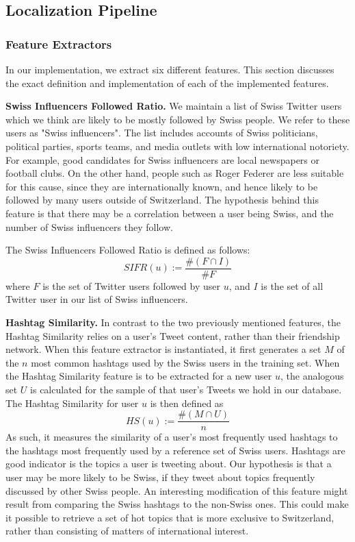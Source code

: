 \documentclass[10pt,a4paper]{article}
\begin{document}
\subsection{Localization Pipeline}
\subsubsection{Feature Extractors}
In our implementation, we extract six different features. This section discusses the exact definition and implementation of each of the implemented features.

\textbf{Swiss Influencers Followed Ratio.} We maintain a list of Swiss Twitter users which we think are likely to be mostly followed by Swiss people. We refer to these users as "Swiss influencers". The list includes accounts of Swiss politicians, political parties, sports teams, and media outlets with low international notoriety. For example, good candidates for Swiss influencers are local newspapers or football clubs. On the other hand, people such as Roger Federer are less suitable for this cause, since they are internationally known, and hence likely to be followed by many users outside of Switzerland. The hypothesis behind this feature is that there may be a correlation between a user being Swiss, and the number of Swiss influencers they follow.

The Swiss Influencers Followed Ratio is defined as follows:
\begin{equation}
SIFR(u) := \frac{\#(F\cap I)}{\#F}
\end{equation}
where $F$ is the set of Twitter users followed by user $u$, and $I$ is the set of all Twitter user in our list of Swiss influencers.

\textbf{Hashtag Similarity.} In contrast to the two previously mentioned features, the Hashtag Similarity relies on a user's Tweet content, rather than their friendship network. When this feature extractor is instantiated, it first generates a set $M$ of the $n$ most common hashtags used by the Swiss users in the training set. When the Hashtag Similarity feature is to be extracted for a new user $u$, the analogous set $U$ is calculated for the sample of that user's Tweets we hold in our database. The Hashtag Similarity for user $u$ is then defined as
\begin{equation}
HS(u) := \frac{\#(M\cap U)}{n}
\end{equation}
As such, it measures the similarity of a user's most frequently used hashtags to the hashtags most frequently used by a reference set of Swiss users. Hashtags are good indicator is the topics a user is tweeting about. Our hypothesis is that a user may be more likely to be Swiss, if they tweet about topics frequently discussed by other Swiss people. An interesting modification of this feature might result from comparing the Swiss hashtags to the non-Swiss ones. This could make it possible to retrieve a set of hot topics that is more exclusive to Switzerland, rather than consisting of matters of international interest.
\end{document}

